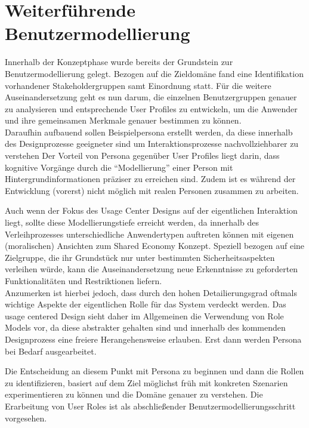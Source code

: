 
\section{Weiterführende Benutzermodellierung}
Innerhalb der Konzeptphase wurde bereits der Grundstein zur Benutzermodellierung gelegt. Bezogen auf die Zieldomäne fand eine Identifikation vorhandener Stakeholdergruppen samt Einordnung statt. Für die weitere Auseinandersetzung geht es nun darum, die einzelnen Benutzergruppen genauer zu analysieren und entsprechende User Profiles zu entwickeln, um die Anwender und ihre gemeinsamen Merkmale genauer bestimmen zu können.\\

Daraufhin aufbauend sollen Beispielpersona erstellt werden, da diese innerhalb des Designprozesse geeigneter sind um Interaktionsprozesse nachvollziehbarer zu verstehen Der Vorteil von Persona gegenüber User Profiles liegt darin, dass kognitive Vorgänge durch die “Modellierung” einer Person mit Hintergrundinformationen präziser zu erreichen sind. Zudem ist es während der Entwicklung (vorerst) nicht möglich mit realen Personen zusammen zu arbeiten. 

Auch wenn der Fokus des Usage Center Designs auf der eigentlichen Interaktion liegt, sollte diese Modellierungstiefe erreicht werden, da innerhalb des Verleihprozesses unterschiedliche Anwendertypen auftreten können mit eigenen (moralischen) Ansichten zum Shared Economy Konzept. Speziell bezogen auf eine Zielgruppe, die ihr Grundstück nur unter bestimmten Sicherheitsaspekten verleihen würde, kann die Auseinandersetzung neue Erkenntnisse zu geforderten Funktionalitäten und Restriktionen liefern.\\

Anzumerken ist hierbei jedoch, dass durch den hohen Detailierungsgrad oftmals wichtige Aspekte der eigentlichen Rolle für das System verdeckt werden. Das usage centered Design sieht daher im Allgemeinen die Verwendung von Role Models vor, da diese abstrakter gehalten sind und innerhalb des kommenden Designprozess eine freiere Herangehensweise erlauben. Erst dann werden Persona bei Bedarf ausgearbeitet.

Die Entscheidung an diesem Punkt mit Persona zu beginnen und dann die Rollen zu identifizieren, basiert auf dem Ziel möglichst früh mit konkreten Szenarien experimentieren zu können und die Domäne genauer zu verstehen. Die Erarbeitung von User Roles ist als abschließender Benutzermodellierungsschritt vorgesehen.


